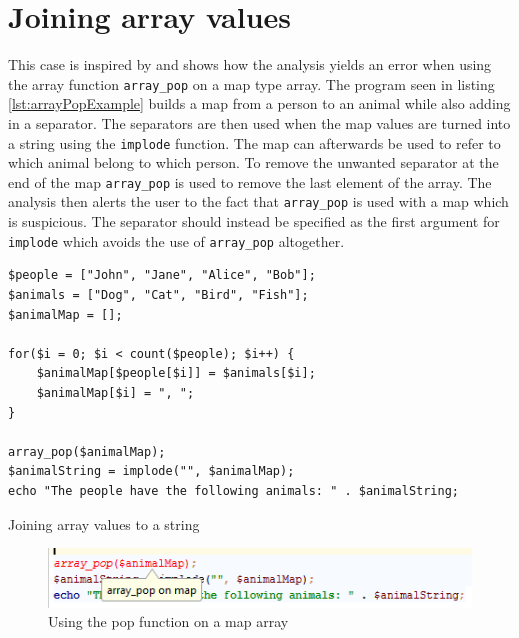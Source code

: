 \section{Joining array values}
This case is inspired by  and shows how the analysis yields an error when using the array function \texttt{array\_pop} on a map type array. The program seen in listing \ref{lst:arrayPopExample} builds a map from a person to an animal while also adding in a separator. The separators are then used when the map values are turned into a string using the \texttt{implode} function. The map can afterwards be used to refer to which animal belong to which person. To remove the unwanted separator at the end of the map \texttt{array\_pop} is used to remove the last element of the array. The analysis then alerts the user to the fact that \texttt{array\_pop} is used with a map which is suspicious. The separator should instead be specified as the first argument for \texttt{implode} which avoids the use of \texttt{array\_pop} altogether.

\begin{program}
\begin{lstlisting}
$people = ["John", "Jane", "Alice", "Bob"];
$animals = ["Dog", "Cat", "Bird", "Fish"];
$animalMap = [];

for($i = 0; $i < count($people); $i++) {
    $animalMap[$people[$i]] = $animals[$i];
    $animalMap[$i] = ", ";
}

array_pop($animalMap);
$animalString = implode("", $animalMap);
echo "The people have the following animals: " . $animalString;
\end{lstlisting}
\caption{Joining array values to a string}
\label{lst:arrayPopExample}
\end{program}

\begin{figure}[htbp]
\centering
\includegraphics[scale=0.6]{chapters/caseStudy/popError}
\caption{Using the pop function on a map array}
\label{fig:arrayPopScreenshot}
\end{figure}